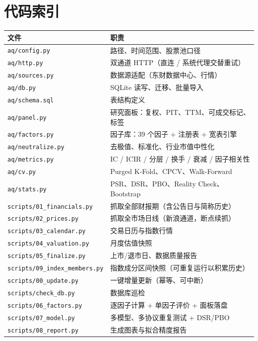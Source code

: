 \chapter{代码索引}\label{app:code}

\begin{longtable}{@{}p{}p{}@{}}
\toprule
\textbf{文件} & \textbf{职责} \\
\midrule
\endhead
\texttt{aq/config.py} & 路径、时间范围、股票池口径 \\
\texttt{aq/http.py} & 双通道 HTTP（直连 / 系统代理交替重试） \\
\texttt{aq/sources.py} & 数据源适配（东财数据中心、行情） \\
\texttt{aq/db.py} & SQLite 读写、迁移、批量导入 \\
\texttt{aq/schema.sql} & 表结构定义 \\
\texttt{aq/panel.py} & 研究面板：复权、PIT、TTM、可成交标记、标签 \\
\texttt{aq/factors.py} & 因子库：39 个因子 + 注册表 + 宽表引擎 \\
\texttt{aq/neutralize.py} & 去极值、标准化、行业市值中性化 \\
\texttt{aq/metrics.py} & IC / ICIR / 分层 / 换手 / 衰减 / 因子相关性 \\
\texttt{aq/cv.py} & Purged K-Fold、CPCV、Walk-Forward \\
\texttt{aq/stats.py} & PSR、DSR、PBO、Reality Check、Bootstrap \\
\midrule
\texttt{scripts/01\_financials.py} & 抓取全部财报期（含公告日与简称历史） \\
\texttt{scripts/02\_prices.py} & 抓取全市场日线（新浪通道，断点续抓） \\
\texttt{scripts/03\_calendar.py} & 交易日历与指数行情 \\
\texttt{scripts/04\_valuation.py} & 月度估值快照 \\
\texttt{scripts/05\_finalize.py} & 上市/退市日、数据质量报告 \\
\texttt{scripts/09\_index\_}\newline\texttt{members.py} & 指数成分区间快照（可重复运行以积累历史） \\
\texttt{scripts/00\_update.py} & 一键增量更新（幂等、可中断） \\
\texttt{scripts/check\_db.py} & 数据库巡检 \\
\texttt{scripts/06\_factors.py} & 逐因子计算 + 单因子评价 + 面板落盘 \\
\texttt{scripts/07\_model.py} & 多模型、多协议重复测试 + DSR/PBO \\
\texttt{scripts/08\_report.py} & 生成图表与拟合精度报告 \\
\bottomrule
\end{longtable}

